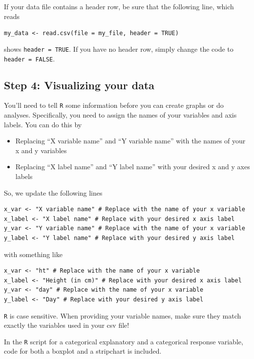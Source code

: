 \documentclass[
]{book}
\providecommand{\tightlist}{%
  \setlength{\itemsep}{0pt}\setlength{\parskip}{0pt}}
\begin{document}
If your data file contains a header row, be sure that the following line, which reads

\texttt{my\_data\ \textless{}-\ read.csv(file\ =\ my\_file,\ header\ =\ TRUE)}

shows \texttt{header\ =\ TRUE}. If you have no header row, simply change the code to \texttt{header\ =\ FALSE}.

\hypertarget{step-4-visualizing-your-data}{%
\subsection*{Step 4: Visualizing your data}\label{step-4-visualizing-your-data}}

You'll need to tell \texttt{R} some information before you can create graphs or do analyses. Specifically, you need to assign the names of your variables and axis labels. You can do this by

\begin{itemize}
\tightlist
\item
  Replacing ``X variable name'' and ``Y variable name'' with the names of your x and y variables
\item
  Replacing ``X label name'' and ``Y label name'' with your desired x and y axes labels
\end{itemize}

So, we update the following lines

\begin{verbatim}
x_var <- "X variable name" # Replace with the name of your x variable
x_label <- "X label name" # Replace with your desired x axis label
y_var <- "Y variable name" # Replace with the name of your x variable
y_label <- "Y label name" # Replace with your desired y axis label
\end{verbatim}

with something like

\begin{verbatim}
x_var <- "ht" # Replace with the name of your x variable
x_label <- "Height (in cm)" # Replace with your desired x axis label
y_var <- "day" # Replace with the name of your x variable
y_label <- "Day" # Replace with your desired y axis label
\end{verbatim}

\texttt{R} is case sensitive. When providing your variable names, make sure they match exactly the variables used in your csv file!

In the \texttt{R} script for a categorical explanatory and a categorical response variable, code for both a boxplot and a stripchart is included.
\end{document}
